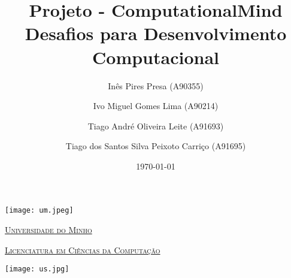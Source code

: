 \documentclass[11pt,a4paper]{report}
\title{Projeto - ComputationalMind\\ Desafios para Desenvolvimento  Computacional} %
\author{Inês Pires Presa (A90355)\and Ivo Miguel Gomes Lima (A90214)\and Tiago André Oliveira Leite (A91693)\and Tiago dos Santos Silva Peixoto Carriço (A91695)} %
\date{\today} %
\begin{document}
\clearpage
\thispagestyle{empty}

  \begin{minipage}{0.9\linewidth}
        \centering
    \texttt{[image: um.jpeg]}\par\vspace{1cm}
                \href{https://www.uminho.pt/PT}
    {\scshape\LARGE Universidade do Minho} \par
    \vspace{0.6cm}
                \href{https://lcc.di.uminho.pt}
    {\scshape\Large Licenciatura em Ciências da Computação} \par
    \maketitle
    \begin{center}
      \texttt{[image: us.jpg]}
\end{center}
  \end{minipage}
\end{document}
